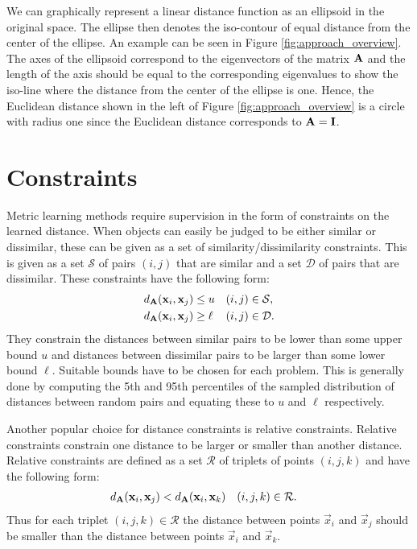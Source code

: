 We can graphically represent a linear distance function as an ellipsoid in the original space. The ellipse then denotes the iso-contour of equal distance from the center of the ellipse. An example can be seen in Figure \ref{fig:approach_overview}. The axes of the ellipsoid correspond to the eigenvectors of the matrix $\mathbf{A}$ and the length of the axis should be equal to the corresponding eigenvalues to show the iso-line where the distance from the center of the ellipse is one. Hence, the Euclidean distance shown in the left of Figure \ref{fig:approach_overview} is a circle with radius one since the Euclidean distance corresponds to $\mathbf{A} = \mathbf{I}$. 



\section{Constraints}
\label{sec:background_constraints}

Metric learning methods require supervision in the form of constraints on the learned distance. When objects can easily be judged to be either similar or dissimilar, these can be given as a set of similarity/dissimilarity constraints. This is given as a set $\mathcal{S}$ of pairs $(i, j)$ that are similar and a set $\mathcal{D}$ of pairs that are dissimilar. These constraints have the following form:
\begin{subequations}
\begin{align}
d_{\mathbf{A}}(\mathbf{x}_i, \mathbf{x}_j) &\leq u & (i, j) &\in \mathcal{S}, \\
d_{\mathbf{A}}(\mathbf{x}_i, \mathbf{x}_j) &\geq \ell & (i, j) &\in \mathcal{D}.
\end{align}
\end{subequations}
They constrain the distances between similar pairs to be lower than some upper bound $u$ and distances between dissimilar pairs to be larger than some lower bound $\ell$. Suitable bounds have to be chosen for each problem. This is generally done by computing the 5th and 95th percentiles of the sampled distribution of distances between random pairs and equating these to  $u$ and $\ell$ respectively.

Another popular choice for distance constraints is relative constraints. Relative constraints constrain one distance to be larger or smaller than another distance. Relative constraints are defined as a set $\mathcal{R}$ of triplets of points $(i,j,k)$ and have the following form:
\begin{align}
d_{\mathbf{A}}(\mathbf{x}_i, \mathbf{x}_j) &< d_{\mathbf{A}}(\mathbf{x}_i, \mathbf{x}_k) & (i, j, k) &\in \mathcal{R}.
\end{align}
Thus for each triplet $(i,j,k) \in \mathcal{R}$ the distance between points $\vec{x}_i$ and $\vec{x}_j$ should be smaller than the distance between points $\vec{x}_i$ and $\vec{x}_k$.

